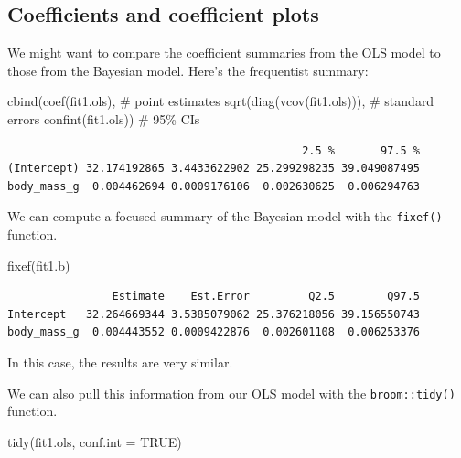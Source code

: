 \documentclass[
  letterpaper,
  DIV=11,
  numbers=noendperiod]{scrartcl}
\newenvironment{Shaded}{\begin{snugshade}}{\end{snugshade}}
\newcommand{\AttributeTok}[1]{\textcolor[rgb]{0.40,0.45,0.13}{#1}}
\newcommand{\CommentTok}[1]{\textcolor[rgb]{0.37,0.37,0.37}{#1}}
\newcommand{\ConstantTok}[1]{\textcolor[rgb]{0.56,0.35,0.01}{#1}}
\newcommand{\FunctionTok}[1]{\textcolor[rgb]{0.28,0.35,0.67}{#1}}
\newcommand{\NormalTok}[1]{\textcolor[rgb]{0.00,0.23,0.31}{#1}}
\begin{document}
\subsection{Coefficients and coefficient
plots}\label{coefficients-and-coefficient-plots}

We might want to compare the coefficient summaries from the OLS model to
those from the Bayesian model. Here's the frequentist summary:

\begin{Shaded}
\begin{Highlighting}[]
\FunctionTok{cbind}\NormalTok{(}\FunctionTok{coef}\NormalTok{(fit1.ols),              }\CommentTok{\# point estimates}
      \FunctionTok{sqrt}\NormalTok{(}\FunctionTok{diag}\NormalTok{(}\FunctionTok{vcov}\NormalTok{(fit1.ols))),  }\CommentTok{\# standard errors}
      \FunctionTok{confint}\NormalTok{(fit1.ols))           }\CommentTok{\# 95\% CIs}
\end{Highlighting}
\end{Shaded}

\begin{verbatim}
                                             2.5 %       97.5 %
(Intercept) 32.174192865 3.4433622902 25.299298235 39.049087495
body_mass_g  0.004462694 0.0009176106  0.002630625  0.006294763
\end{verbatim}

We can compute a focused summary of the Bayesian model with the
\texttt{fixef()} function.

\begin{Shaded}
\begin{Highlighting}[]
\FunctionTok{fixef}\NormalTok{(fit1.b)}
\end{Highlighting}
\end{Shaded}

\begin{verbatim}
                Estimate    Est.Error         Q2.5        Q97.5
Intercept   32.264669344 3.5385079062 25.376218056 39.156550743
body_mass_g  0.004443552 0.0009422876  0.002601108  0.006253376
\end{verbatim}

In this case, the results are very similar.

We can also pull this information from our OLS model with the
\texttt{broom::tidy()} function.

\begin{Shaded}
\begin{Highlighting}[]
\FunctionTok{tidy}\NormalTok{(fit1.ols, }\AttributeTok{conf.int =} \ConstantTok{TRUE}\NormalTok{)}
\end{Highlighting}
\end{Shaded}
\end{document}
